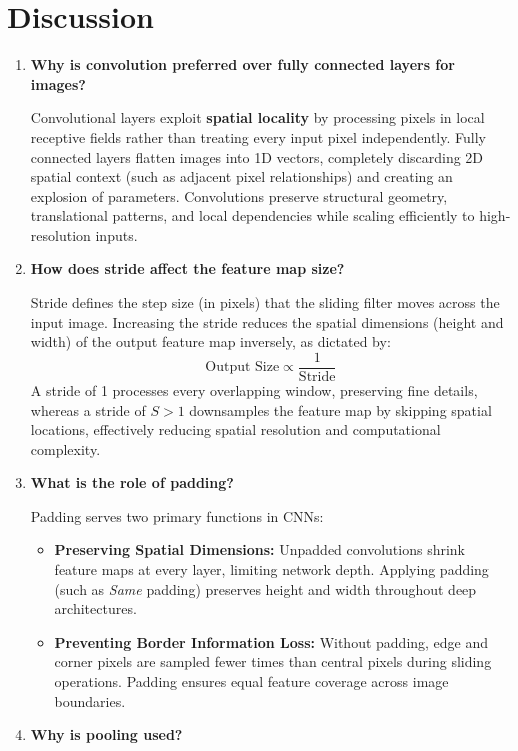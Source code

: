 \documentclass[11pt]{article}
\begin{document}
\section{Discussion}
\begin{enumerate}
    \item \textbf{Why is convolution preferred over fully connected layers for images?}
    
    Convolutional layers exploit \textbf{spatial locality} by processing pixels in local receptive fields rather than treating every input pixel independently. Fully connected layers flatten images into 1D vectors, completely discarding 2D spatial context (such as adjacent pixel relationships) and creating an explosion of parameters. Convolutions preserve structural geometry, translational patterns, and local dependencies while scaling efficiently to high-resolution inputs.

    \item \textbf{How does stride affect the feature map size?}
    
    Stride defines the step size (in pixels) that the sliding filter moves across the input image. Increasing the stride reduces the spatial dimensions (height and width) of the output feature map inversely, as dictated by:
    \[
    \text{Output Size} \propto \frac{1}{\text{Stride}}
    \]
    A stride of 1 processes every overlapping window, preserving fine details, whereas a stride of $S > 1$ downsamples the feature map by skipping spatial locations, effectively reducing spatial resolution and computational complexity.

    \item \textbf{What is the role of padding?}
    
    Padding serves two primary functions in CNNs:
    \begin{itemize}
        \item \textbf{Preserving Spatial Dimensions:} Unpadded convolutions shrink feature maps at every layer, limiting network depth. Applying padding (such as \textit{Same} padding) preserves height and width throughout deep architectures.
        \item \textbf{Preventing Border Information Loss:} Without padding, edge and corner pixels are sampled fewer times than central pixels during sliding operations. Padding ensures equal feature coverage across image boundaries.
    \end{itemize}

    \item \textbf{Why is pooling used?}
    

\end{enumerate}
\end{document}
